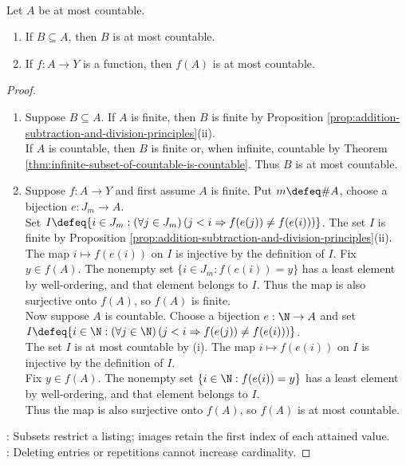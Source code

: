 \begin{proposition} \label{prop:subsets-and-images-at-most-countable} \\
Let $A$ be at most countable.
\begin{enumerate}[label=(\roman*)]
\setlength{\itemsep}{0pt}
\item If $B\subseteq A$, then $B$ is at most countable.
\item If $f:A\to Y$ is a function, then $f(A)$ is at most countable.
\end{enumerate}
\begin{proof}
\begin{enumerate}[label=(\roman*)]
\setlength{\itemsep}{0pt}
\item Suppose $B\subseteq A$. If $A$ is finite, then $B$ is finite by Proposition \ref{prop:addition-subtraction-and-division-principles}(ii).\\
If $A$ is countable, then $B$ is finite or, when infinite, countable by Theorem \ref{thm:infinite-subset-of-countable-is-countable}. Thus $B$ is at most countable.
\item Suppose $f:A\to Y$ and first assume $A$ is finite. Put $m\defeq\#A$, choose a bijection $e:J_m\to A$.\\
Set $I\defeq\{i\in J_m:(\forall j\in J_m)\,(j<i\Rightarrow f(e(j))\neq f(e(i)))\}$. The set $I$ is finite by Proposition \ref{prop:addition-subtraction-and-division-principles}(ii).\\
The map $i\mapsto f(e(i))$ on $I$ is injective by the definition of $I$. Fix $y\in f(A)$. The nonempty set $\{i\in J_m:f(e(i))=y\}$ has a least element by well-ordering, and that element belongs to $I$. Thus the map is also surjective onto $f(A)$, so $f(A)$ is finite.\\
Now suppose $A$ is countable. Choose a bijection $e:\N\to A$ and set $I\defeq\{i\in\N:(\forall j\in\N)\,(j<i\Rightarrow f(e(j))\neq f(e(i)))\}$.\\
The set $I$ is at most countable by (i). The map $i\mapsto f(e(i))$ on $I$ is injective by the definition of $I$.\\
Fix $y\in f(A)$. The nonempty set $\{i\in\N:f(e(i))=y\}$ has a least element by well-ordering, and that element belongs to $I$.\\
Thus the map is also surjective onto $f(A)$, so $f(A)$ is at most countable.
\end{enumerate}
: Subsets restrict a listing; images retain the first index of each attained value.\\
: Deleting entries or repetitions cannot increase cardinality.
\end{proof}
\end{proposition}


